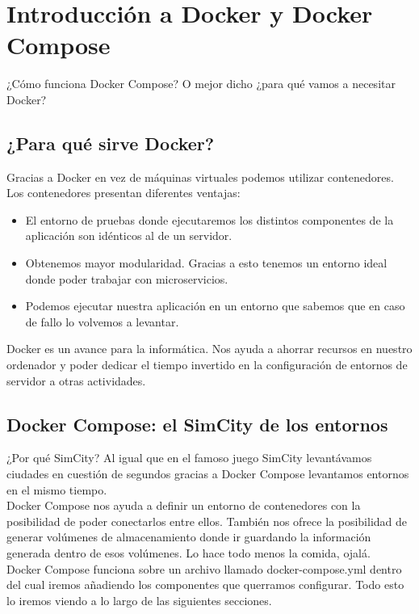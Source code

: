 \section{Introducción a Docker y Docker Compose}
¿Cómo funciona Docker Compose? O mejor dicho ¿para qué vamos a necesitar Docker?

\subsection{¿Para qué sirve Docker?}
Gracias a Docker en vez de máquinas virtuales podemos utilizar contenedores. Los contenedores presentan diferentes ventajas:

\begin{itemize}
  \item El entorno de pruebas donde ejecutaremos los distintos componentes de la aplicación son idénticos al de un servidor.
  \item Obtenemos mayor modularidad. Gracias a esto tenemos un entorno ideal donde poder trabajar con microservicios.
  \item Podemos ejecutar nuestra aplicación en un entorno que sabemos que en caso de fallo lo volvemos a levantar.
\end{itemize}

Docker es un avance para la informática. Nos ayuda a ahorrar recursos en nuestro ordenador y poder dedicar el tiempo invertido en la configuración de entornos de servidor a otras actividades.

\subsection{Docker Compose: el SimCity de los entornos}

¿Por qué SimCity? Al igual que en el famoso juego SimCity levantávamos ciudades en cuestión de segundos gracias a Docker Compose levantamos entornos en el mismo tiempo.
\\Docker Compose nos ayuda a definir un entorno de contenedores con la posibilidad de poder conectarlos entre ellos. También nos ofrece la posibilidad de generar volúmenes de almacenamiento donde ir guardando la información generada dentro de esos volúmenes. Lo hace todo menos la comida, ojalá.
\\Docker Compose funciona sobre un archivo llamado docker-compose.yml dentro del cual iremos añadiendo los componentes que querramos configurar. Todo esto lo iremos viendo a lo largo de las siguientes secciones.